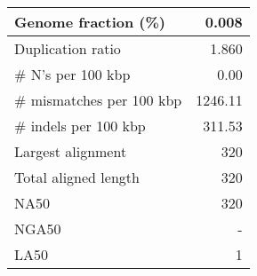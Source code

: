 \documentclass[12pt,a4paper]{article}
\begin{document}
\begin{table}[ht]
\begin{center}
\begin{tabular}{|l*{1}{|r}|}
Genome fraction (\%) & 0.008 \\ \hline
Duplication ratio & 1.860 \\ \hline
\# N's per 100 kbp & 0.00 \\ \hline
\# mismatches per 100 kbp & 1246.11 \\ \hline
\# indels per 100 kbp & 311.53 \\ \hline
Largest alignment & 320 \\ \hline
Total aligned length & 320 \\ \hline
NA50 & 320 \\ \hline
NGA50 & - \\ \hline
LA50 & 1 \\ \hline
\end{tabular}
\end{center}
\end{table}
\end{document}
